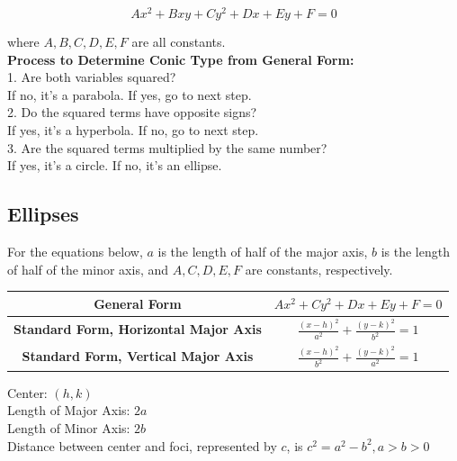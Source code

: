 \documentclass{article}
\begin{document}
    \begin{equation*}
        Ax^2+Bxy+Cy^2+Dx+Ey+F=0
    \end{equation*}

    \noindent where $A,B,C,D,E,F$ are all constants. \\

    \noindent \color{purple} \textbf{Process to Determine Conic Type from General Form:} \color{black} \\
    1. Are both variables squared? \\
    If no, it's a parabola. If yes, go to next step. \\
    2. Do the squared terms have opposite signs? \\
    If yes, it's a hyperbola. If no, go to next step. \\
    3. Are the squared terms multiplied by the same number? \\
    If yes, it's a circle. If no, it's an ellipse.

    \pagebreak

    \subsection{Ellipses}
    For the equations below, $a$ is the length of half of the major axis, $b$ is the length of
    half of the minor axis, and $A,C,D,E,F$ are constants, respectively. \\

    \begin{center}
        \begin{tabular}{|c|c|}
            \hline
            \textbf{General Form}
            & $Ax^2+Cy^2+Dx+Ey+F=0$                       \\
            \hline
            \textbf{Standard Form, Horizontal Major Axis}
            & $\frac{(x-h)^2}{a^2}+\frac{(y-k)^2}{b^2}=1$ \\
            \hline
            \textbf{Standard Form, Vertical Major Axis}
            & $\frac{(x-h)^2}{b^2}+\frac{(y-k)^2}{a^2}=1$ \\
            \hline
        \end{tabular}
    \end{center}

    \noindent Center: $(h,k)$ \\
    Length of Major Axis: $2a$ \\
    Length of Minor Axis: $2b$ \\
    Distance between center and foci, represented by $c$, is $c^2=a^2-b^2,a>b>0$ \\
\end{document}
